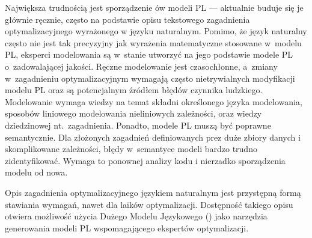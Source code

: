 Największa trudnością jest sporządzenie ów modeli PL --- aktualnie buduje się je głównie ręcznie, często na podstawie opisu tekstowego zagadnienia optymalizacyjnego wyrażonego w języku naturalnym.  Pomimo, że język naturalny często nie jest tak precyzyjny jak wyrażenia matematyczne stosowane w~modelu PL, eksperci modelowania są w~stanie utworzyć na jego podstawie modele PL o~zadowalającej jakości.
Ręczne modelowanie jest czasochłonne, a~zmiany w~zagadnieniu optymalizacyjnym wymagają często nietrywialnych modyfikacji modelu PL oraz są potencjalnym źródłem błędów czynnika ludzkiego. Modelowanie wymaga wiedzy na temat składni określonego języka modelowania, sposobów liniowego modelowania nieliniowych zależności, oraz wiedzy dziedzinowej nt.~zagadnienia.
Ponadto, modele PL muszą być poprawne semantycznie. %
Dla złożonych zagadnień definiowanych prez duże zbiory danych i skomplikowane zależności, błędy w~semantyce modeli bardzo trudno zidentyfikować. Wymaga to ponownej analizy kodu i nierzadko sporządzenia modelu od nowa.

Opis zagadnienia optymalizacyjnego językiem naturalnym jest przystępną formą stawiania wymagań, nawet dla laików optymalizacji. Dostępność takiego opisu otwiera możliwość użycia Dużego Modelu Językowego ()  \cite{TODO} %
jako narzędzia generowania modeli PL wspomagającego ekspertów optymalizacji.


